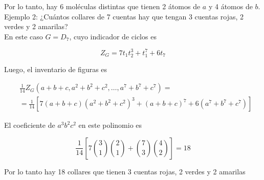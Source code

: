 \documentclass[10pt]{article}
\begin{document}
Por lo tanto, hay 6 moléculas distintas que tienen 2 átomos de $a$ y 4 átomos de $b$.\\
Ejemplo 2: ¿Cuántos collares de 7 cuentas hay que tengan 3 cuentas rojas, 2 verdes y 2 amarilas?\\
En este caso $G=D_{7}$, cuyo indicador de ciclos es

$$
Z_{G}=7 t_{1} t_{2}^{3}+t_{1}^{7}+6 t_{7}
$$

Luego, el inventario de figuras es

$$
\begin{aligned}
& \frac{1}{14} Z_{G}\left(a+b+c, a^{2}+b^{2}+c^{2}, \ldots, a^{7}+b^{7}+c^{7}\right)= \\
& =\frac{1}{14}\left[7(a+b+c)\left(a^{2}+b^{2}+c^{2}\right)^{3}+(a+b+c)^{7}+6\left(a^{7}+b^{7}+c^{7}\right)\right]
\end{aligned}
$$

El coeficiente de $a^{3} b^{2} c^{2}$ en este polinomio es

$$
\frac{1}{14}\left[7\binom{3}{1}\binom{2}{1}+\binom{7}{3}\binom{4}{2}\right]=18
$$

Por lo tanto hay 18 collares que tienen 3 cuentas rojas, 2 verdes y 2 amarilas
\end{document}
